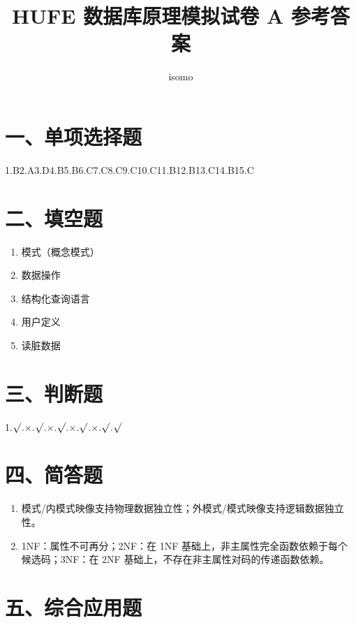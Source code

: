 \documentclass{../../note}
\title{HUFE 数据库原理模拟试卷 A 参考答案}
\author{isomo}
\begin{document}
\fontsize{12pt}{14.4pt}\selectfont
\maketitle

\section*{一、单项选择题}

1.B\quad 2.A\quad 3.D\quad 4.B\quad 5.B\quad 6.C\quad 7.C\quad 8.C\quad 9.C\quad 10.C\quad 11.B\quad 12.B\quad 13.C\quad 14.B\quad 15.C

\section*{二、填空题}

\begin{enumerate}
\item 模式（概念模式）
\item 数据操作
\item 结构化查询语言
\item 用户定义
\item 读脏数据
\end{enumerate}

\section*{三、判断题}

1.$\surd$.$\times$.$\surd$.$\times$.$\surd$.$\times$.$\surd$.$\times$.$\surd$.$\surd$

\section*{四、简答题}

\begin{enumerate}[itemsep=0.8em]
\item 模式/内模式映像支持物理数据独立性；外模式/模式映像支持逻辑数据独立性。
\item 1NF：属性不可再分；2NF：在 1NF 基础上，非主属性完全函数依赖于每个候选码；3NF：在 2NF 基础上，不存在非主属性对码的传递函数依赖。
\end{enumerate}

\section*{五、综合应用题}
\end{document}
